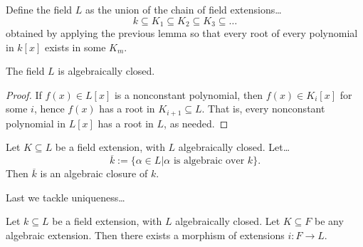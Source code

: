 Define the field $L$ as the union of the chain of field extensions\dots
$$k \subseteq K_1 \subseteq K_2 \subseteq K_3 \subseteq \dots$$
obtained by applying the previous lemma so that every root of every polynomial in $k[x]$ exists in some $K_m$.

\begin{proposition}
The field $L$ is algebraically closed.
\end{proposition}

\begin{proof}
If $f(x) \in L[x]$ is a nonconstant polynomial, then $f(x) \in K_i[x]$ for some $i$, hence $f(x)$ has a root in $K_{i+1} \subseteq L$.
That is, every nonconstant polynomial in $L[x]$ has a root in $L$, as needed.
\end{proof}

\begin{lemma}
Let $K \subseteq L$ be a field extension, with $L$ algebraically closed. Let\dots
$$\overline{k} := \{ \alpha \in L | \alpha \textrm{ is algebraic over } k \}.$$
Then $\overline{k}$ is an algebraic closure of $k$.
\end{lemma}

\noindent Last we tackle uniqueness\dots

\begin{lemma}
Let $k \subseteq L$ be a field extension, with $L$ algebraically closed. Let $K \subseteq F$ be any algebraic extension.
Then there exists a morphism of extensions $i : F \rightarrow L$.
\end{lemma}

